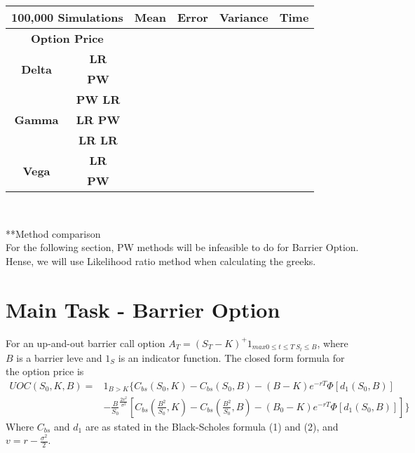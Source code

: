 \documentclass[12pt,a4paper,fleqn]{article}
\begin{document}
\begin{center}
\label{my-label}
\begin{tabular}{|c|c|c|c|c|c|}
\hline
\multicolumn{2}{|c|}{\textbf{100,000 Simulations}} & \textbf{Mean} & \textbf{Error} & \textbf{Variance} & \textbf{Time} \\ \hline
\multicolumn{2}{|c|}{\textbf{Option Price}}        &               &                &                   &               \\ \hline
\multirow{2}{*}{\textbf{Delta}}  & \textbf{LR}     &               &                &                   &               \\ \cline{2-6}
                                 & \textbf{PW}     &               &                &                   &               \\ \hline
\multirow{3}{*}{\textbf{Gamma}}  & \textbf{PW LR}  &               &                &                   &               \\ \cline{2-6}
                                 & \textbf{LR PW}  &               &                &                   &               \\ \cline{2-6}
                                 & \textbf{LR LR}  &               &                &                   &               \\ \hline
\multirow{2}{*}{\textbf{Vega}}   & \textbf{LR}     &               &                &                   &               \\ \cline{2-6}
                                 & \textbf{PW}     &               &                &                   &               \\ \hline
\end{tabular}\\
\end{center}



**Method comparison\\
For the following section, PW methods will be infeasible to do for Barrier Option. Hense, we will use Likelihood ratio method when calculating the greeks.

\section{Main Task - Barrier Option}

For an up-and-out barrier call option $A_T=(S_T-K)^+1_{max 0\leq t\leq T \  S_t\leq B}$, where $B$ is a barrier leve and $1_S$ is an indicator function. The closed form formula for the option price is
\begin{equation}
\begin{aligned}
UOC(S_0,K,B) ={} &1_{B>K} \{ C_{bs}(S_0, K)-C_{bs}(S_0,B)-(B-K)e^{-rT}\Phi[d_{1}(S_0,B)] \\
      & -\frac{B}{S_0}^{\frac{2v^2}{\sigma^2}}\left[C_{bs}(\frac{B^2}{S_0}, K)-C_{bs}(\frac{B^2}{S_0}, B) -(B_0-K)e^{-rT}\Phi[d_{1}(S_0,B)]\right]\}
\end{aligned}
\end{equation}
Where $C_{bs}$ and $d_{1}$ are as stated in the Black-Scholes formula (1) and (2), and $v=r-\frac{\sigma^2}{2}$.\\
\end{document}
